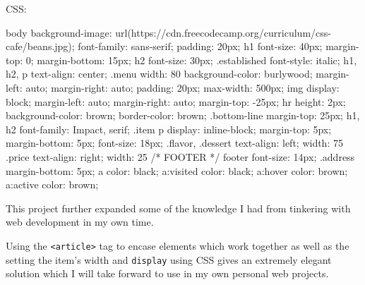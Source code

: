 CSS:
\begin{css}
body {
  background-image: url(https://cdn.freecodecamp.org/curriculum/css-cafe/beans.jpg);
  font-family: sans-serif;
  padding: 20px;
}
h1 {
  font-size: 40px;
  margin-top: 0;
  margin-bottom: 15px;
}
h2 {
  font-size: 30px;
}
.established {
  font-style: italic;
}
h1, h2, p {
  text-align: center;
}
.menu {
  width: 80%
  background-color: burlywood;
  margin-left: auto;
  margin-right: auto;
  padding: 20px;
  max-width: 500px;
}
img {
  display: block;
  margin-left: auto;
  margin-right: auto;
  margin-top: -25px;
}
hr {
  height: 2px;
  background-color: brown;
  border-color: brown;
}
.bottom-line {
  margin-top: 25px;
}
h1, h2 {
  font-family: Impact, serif;
}
.item p {
  display: inline-block;
  margin-top: 5px;
  margin-bottom: 5px;
  font-size: 18px;
}
.flavor, .dessert {
  text-align: left;
  width: 75%
}
.price {
  text-align: right;
  width: 25%
}
/* FOOTER */
footer {
  font-size: 14px;
}
.address {
  margin-bottom: 5px;
}
a {
  color: black;
}
a:visited {
  color: black;
}
a:hover {
  color: brown;
}
a:active {
  color: brown;
}
\end{css}
This project further expanded some of the knowledge I had from tinkering with web development in my own time. 

Using the \texttt{<article>} tag to encase elements which work together as well as the setting the item's width and \texttt{display} using CSS gives an extremely elegant solution which I will take forward to use in my own personal web projects. 

